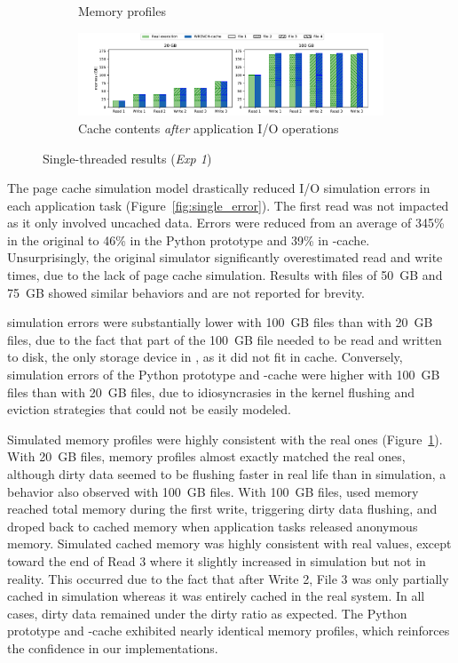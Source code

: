 \begin{figure}
\begin{subfigure}{\linewidth}
           \caption{Memory profiles}
           \vspace*{0.5cm}
           \label{fig:single_memprof}
    \end{subfigure}
    \begin{subfigure}{\linewidth}
        \centering
           \includegraphics[width=\linewidth]{result/single/figures/cached_files.pdf}
           \caption{Cache contents \emph{after} application I/O operations}
           \label{fig:single_cache}
    \end{subfigure}
    \caption{Single-threaded results (\textit{Exp 1})}
\end{figure}

The page cache simulation model drastically reduced I/O simulation
errors in each application task (Figure~\ref{fig:single_error}). The first read was not impacted
as it only involved uncached data. Errors were reduced from an average
of 345\% in the original \wrench to 46\% in the Python prototype and
39\% in \wrench-cache. Unsurprisingly, the original \wrench simulator
significantly overestimated read and write times, due to the lack
of page cache simulation. Results with files of 50~GB and 75~GB
showed similar behaviors and are not reported for brevity.

\wrench simulation errors were substantially lower with 100~GB
files than with 20~GB files, due to the fact that part of the
100~GB file needed to be read and written to disk, the only storage
device in \wrench, as it did not fit in cache. Conversely,
simulation errors of the Python prototype and \wrench-cache were higher with
100~GB files than with 20~GB files, due to idiosyncrasies in the kernel
flushing and eviction strategies that could not be easily modeled.

Simulated memory profiles were highly consistent with the real ones
(Figure~\ref{fig:single_memprof}). With 20~GB files, memory profiles almost exactly matched the
real ones, although dirty data seemed to be flushing faster in real
life than in simulation, a behavior also
observed with 100~GB files. With 100~GB files, used memory reached
total memory during the first write, triggering dirty data
flushing, and droped back to cached memory when application tasks
released anonymous memory. Simulated cached memory was highly
consistent with real values, except toward the end of Read 3 where
it slightly increased in simulation but not in reality. This
occurred due to the fact that after Write 2, File 3 was only partially
cached in simulation whereas it was entirely cached in the real
system. In all cases, dirty data remained under the dirty ratio as
expected. The Python prototype and \wrench-cache exhibited nearly
identical memory profiles, which reinforces the confidence in our
implementations.

